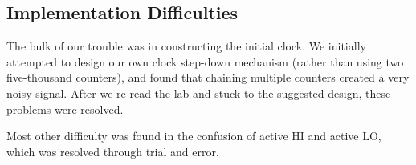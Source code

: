 \documentclass[paper=letter, fontsize=11pt]{scrartcl}
\begin{document}
\subsection{Implementation Difficulties}
The bulk of our trouble was in constructing the initial clock. We initially attempted to design our own clock step-down mechanism (rather than using two five-thousand counters), and found that chaining multiple counters created a very noisy signal. After we re-read the lab and stuck to the suggested design, these problems were resolved.

Most other difficulty was found in the confusion of active HI and active LO, which was resolved through trial and error.

\end{document}
